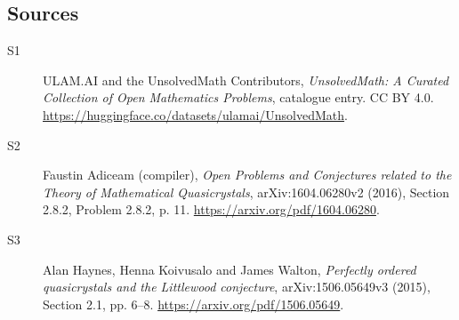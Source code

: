 \documentclass[11pt]{article}
\begin{document}
\subsection{Sources}
\begin{description}
\item[\hypertarget{source:statement:1}{S1}] ULAM.AI and the UnsolvedMath Contributors, \emph{UnsolvedMath: A Curated Collection of Open Mathematics Problems}, catalogue entry. CC BY 4.0. \url{https://huggingface.co/datasets/ulamai/UnsolvedMath}.
\item[\hypertarget{source:statement:2}{S2}] Faustin Adiceam (compiler), \emph{Open Problems and Conjectures related to the Theory of Mathematical Quasicrystals}, arXiv:1604.06280v2 (2016), Section 2.8.2, Problem 2.8.2, p. 11. \url{https://arxiv.org/pdf/1604.06280}.
\item[\hypertarget{source:statement:3}{S3}] Alan Haynes, Henna Koivusalo and James Walton, \emph{Perfectly ordered quasicrystals and the Littlewood conjecture}, arXiv:1506.05649v3 (2015), Section 2.1, pp. 6--8. \url{https://arxiv.org/pdf/1506.05649}.
\end{description}
\label{end:statement}
\end{document}

